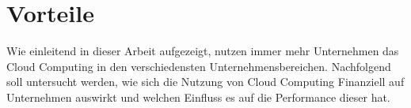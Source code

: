 \section{Vorteile}
Wie einleitend in dieser Arbeit aufgezeigt, nutzen immer mehr Unternehmen das Cloud Computing in den verschiedensten Unternehmensbereichen. Nachfolgend soll untersucht werden, wie sich die Nutzung von Cloud Computing Finanziell auf Unternehmen auswirkt und welchen Einfluss es auf die Performance dieser hat.